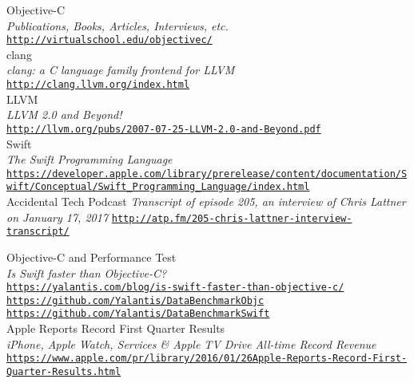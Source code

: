 \cleardoublepage
{}
{}
\begin{thebibliography}{}

 Objective-C\\
  \emph{Publications, Books, Articles, Interviews, etc.} \\
  \footnotesize \texttt{\url{http://virtualschool.edu/objectivec/}} \\
  
 clang\\
  \emph{clang: a C language family frontend for LLVM} \\
  \footnotesize \texttt{\url{http://clang.llvm.org/index.html}} \\
  
 LLVM\\
 \emph{LLVM 2.0 and Beyond!} \\
  \footnotesize \texttt{\url{http://llvm.org/pubs/2007-07-25-LLVM-2.0-and-Beyond.pdf}} \\
  
 Swift\\
 \emph{The Swift Programming Language} \\
  \footnotesize \texttt{\url{https://developer.apple.com/library/prerelease/content/documentation/Swift/Conceptual/Swift_Programming_Language/index.html}} 
 \\
 
  Accidental Tech Podcast
 \emph{Transcript of episode 205, an interview of Chris Lattner on January 17, 2017}
 \footnotesize
 \texttt{\url{http://atp.fm/205-chris-lattner-interview-transcript/}}
  
  
 Objective-C and Performance Test\\
\emph{Is Swift faster than Objective-C?}\\
\footnotesize
\texttt{\url{https://yalantis.com/blog/is-swift-faster-than-objective-c/}}
\texttt{\url{https://github.com/Yalantis/DataBenchmarkObjc}}
\texttt{\url{https://github.com/Yalantis/DataBenchmarkSwift}}
 \\
 
  Apple Reports Record First Quarter Results\\
 \emph{iPhone, Apple Watch, Services \& Apple TV Drive All-time Record Revenue}\\
 \footnotesize
 \texttt{\url{https://www.apple.com/pr/library/2016/01/26Apple-Reports-Record-First-Quarter-Results.html}}\\
 
\end{thebibliography}

